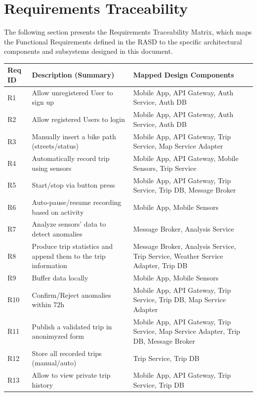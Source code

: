 \chapter{Requirements Traceability}

The following section presents the Requirements Traceability Matrix, which maps the Functional Requirements defined in the RASD to the specific architectural components and subsystems designed in this document.

\small
\begin{tabular}{|l|p{6cm}|p{7cm}|}
\hline
\textbf{Req ID} & \textbf{Description (Summary)} & \textbf{Mapped Design Components} \\
\hline
R1 & Allow unregistered User to sign up & Mobile App, API Gateway, Auth Service, Auth DB \\
\hline
R2 & Allow registered Users to login & Mobile App, API Gateway, Auth Service, Auth DB \\
\hline
R3 & Manually insert a bike path (streets/status) & Mobile App, API Gateway, Trip Service, Map Service Adapter \\
\hline
R4 & Automatically record trip using sensors & Mobile App, API Gateway, Mobile Sensors, Trip Service \\
\hline
R5 & Start/stop via button press & Mobile App, API Gateway, Trip Service, Trip DB, Message Broker \\
\hline
R6 & Auto-pause/resume recording based on activity & Mobile App, Mobile Sensors \\
\hline
R7 & Analyze sensors' data to detect anomalies & Message Broker, Analysis Service \\
\hline
R8 & Produce trip statistics and append them to the trip information & Message Broker, Analysis Service, Trip Service, Weather Service Adapter, Trip DB \\
\hline
R9 & Buffer data locally & Mobile App, Mobile Sensors \\
\hline
R10 & Confirm/Reject anomalies within 72h & Mobile App, API Gateway, Trip Service, Trip DB, Map Service Adapter \\
\hline
R11 & Publish a validated trip in anonimyzed form & Mobile App, API Gateway, Trip Service, Map Service Adapter, Trip DB, Message Broker \\
\hline
R12 & Store all recorded trips (manual/auto) & Trip Service, Trip DB \\
\hline
R13 & Allow to view private trip history & Mobile App, API Gateway, Trip Service, Trip DB \\

\end{tabular}
